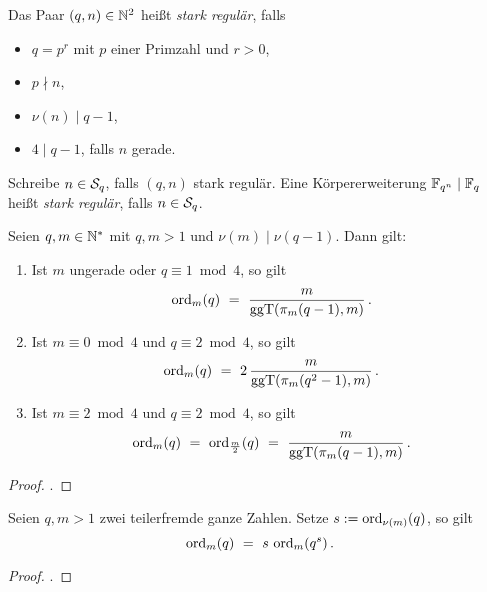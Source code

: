 \begin{definition}
  \label{def:stark_regular}
  Das Paar $(q,n) \in \N^2$ heißt \emph{stark regulär}, falls
  \begin{itemize}
    \item $q = p^r$ mit $p$ einer Primzahl und $r>0$,
    \item $p \nmid n$,
    \item $\nu(n) \mid q-1$,
    \item $4 \mid q-1$, falls $n$ gerade.
  \end{itemize}
  Schreibe $n \in \S_q$, falls $(q,n)$ stark regulär.
  Eine Körpererweiterung $\F_{q^n} \mid \F_q$ heißt \emph{stark regulär}, falls
  $n \in \S_q$.
\end{definition}

\begin{lemma}
  \label{lemma:ordn_1}
  Seien $q,m \in \N^\ast$ mit $q,m > 1$ und $\nu(m) \mid \nu(q-1)$. Dann gilt:
  \begin{enumerate}
    \item Ist $m$ ungerade oder $q\equiv 1 \bmod 4$, so gilt
      \[ \ord_m(q) \speq= \frac{m}{\ggT(\pi_m(q-1),m)}\,.\]
    \item Ist $m\equiv 0\bmod 4$ und $q\equiv 2 \bmod 4$, so gilt
      \[ \ord_m(q) \speq= 2\,\frac{m}{\ggT(\pi_m(q^2-1),m)}\,.\]
    \item Ist $m\equiv 2\bmod 4$ und $q\equiv 2 \bmod 4$, so gilt
      \[ \ord_m(q) \speq= \ord_{\frac m 2}(q) \speq=
        \frac{m}{\ggT(\pi_m(q-1),m)}\,.\]
  \end{enumerate}
\end{lemma}
\begin{proof}
  \autocite[Lemma 19.6]{hachenberger1997finite}.
\end{proof}

\begin{lemma}
  \label{lemma:ordn_2}
  Seien $q,m>1$ zwei teilerfremde ganze Zahlen. Setze 
  $s :=\ord_{\nu(m)}(q)$, so gilt
  \[ \ord_m(q) \speq= s\,\ord_m(q^s)\,.\]
\end{lemma}
\begin{proof}
  \autocite[Lemma 19.7]{hachenberger1997finite}.
\end{proof}

